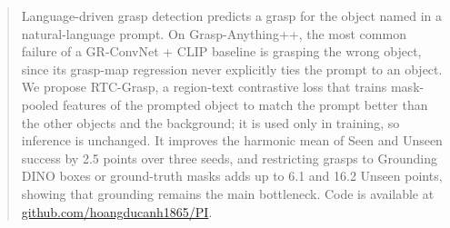 \begin{abstract}
Language-driven grasp detection predicts a grasp for the object named in a natural-language prompt.
On Grasp-Anything++, the most common failure of a GR-ConvNet + CLIP baseline is grasping the wrong object, since its grasp-map regression never explicitly ties the prompt to an object.
We propose RTC-Grasp, a region-text contrastive loss that trains mask-pooled features of the prompted object to match the prompt better than the other objects and the background; it is used only in training, so inference is unchanged.
It improves the harmonic mean of Seen and Unseen success by 2.5 points over three seeds, and restricting grasps to Grounding DINO boxes or ground-truth masks adds up to 6.1 and 16.2 Unseen points, showing that grounding remains the main bottleneck.
Code is available at \href{https://github.com/hoangducanh1865/PI}{github.com/hoangducanh1865/PI}.
\end{abstract}
